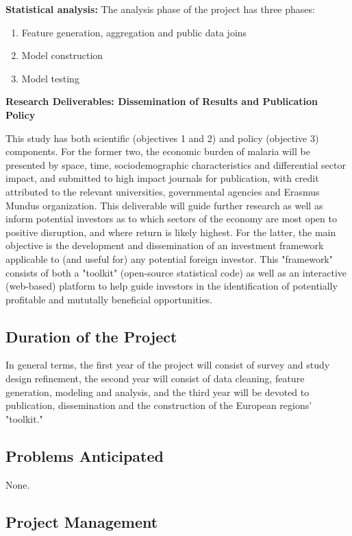 \documentclass{article}
\begin{document}
\begin{multicols}{2}
\noindent \textbf{Statistical analysis:} The analysis phase of the project has three phases: \begin{enumerate}
\item Feature generation, aggregation and public data joins
\item Model construction 
\item Model testing
\end{enumerate}




\noindent \textbf{Research Deliverables: Dissemination of Results and Publication Policy}

This study has both scientific (objectives 1 and 2) and policy (objective 3) components.  For the former two, the economic burden of malaria will be presented by space, time, sociodemographic characteristics and differential sector impact, and submitted to high impact journals for publication, with credit attributed to the relevant universities, governmental agencies and Erasmus Mundus organization. This deliverable will guide further research as well as inform potential investors as to which sectors of the economy are most open to positive disruption, and where return is likely highest.  For the latter, the main objective is the development and dissemination of an investment framework applicable to (and useful for) any potential foreign investor.  This "framework" consists of both a "toolkit" (open-source statistical code) as well as an interactive (web-based) platform to help guide investors in the identification of potentially profitable and mututally beneficial opportunities.  

\subsection*{Duration of the Project}

In general terms, the first year of the project will consist of survey and study design refinement, the second year will consist of data cleaning, feature generation, modeling and analysis, and the third year will be devoted to publication, dissemination and the construction of the European regions' "toolkit."  

\subsection*{Problems Anticipated}

None.

\subsection*{Project Management}


\end{multicols}
\end{document}

